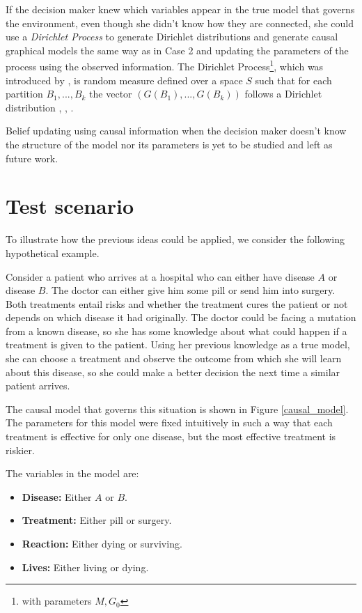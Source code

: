 \documentclass{article}
\begin{document}
If the decision maker knew which variables appear in the true model that governs the environment, even though she didn't know how they are connected, she could use a \textit{Dirichlet Process} to generate Dirichlet distributions and generate causal graphical models the same way as in Case 2 and updating the parameters of the process using the observed information. The Dirichlet Process\footnote{with parameters $M,G_0$}, which was introduced by \cite{ferguson1973bayesian}, is random measure defined over a space $S$ such that for each partition $B_1,...,B_k$ the vector $(G(B_1),...,G(B_k))$ follows a Dirichlet distribution \cite{hjort2010bayesian}, \cite{muller2016bayesian}, \cite{ghosal2017fundamentals}. 

Belief updating using causal information when the decision maker doesn't know the structure of the model nor its parameters is yet to be studied and left as future work. 

\section{Test scenario}
To illustrate how the previous ideas could be applied, we consider the following hypothetical example.

Consider a patient who arrives at a hospital who can either have disease $A$ or disease $B$. The doctor can either give him some pill or send him into surgery.  Both treatments entail risks and whether the treatment cures the patient or not depends on which disease it had originally. The doctor could be facing a mutation from a known disease, so she has some knowledge about what could happen if a treatment is given to the patient. Using her previous knowledge as a true model, she can choose a treatment and observe the outcome from which she will learn about this disease, so she could make a better decision the next time a similar patient arrives.

The causal model that governs this situation is shown in Figure \ref{causal_model}. The parameters for this model were fixed intuitively in such a way that each treatment is effective for only one disease, but the most effective treatment is riskier.

The variables in the model are: 
\begin{itemize}
\item \textbf{Disease:} Either $A$ or $B$.
\item \textbf{Treatment:} Either pill or surgery.
\item \textbf{Reaction:} Either dying or surviving.
\item \textbf{Lives:} Either living or dying.
\end{itemize}
\end{document}
